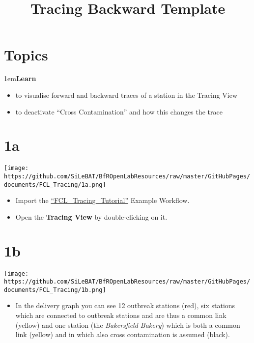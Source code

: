 \documentclass[10pt]{beamer}
\title{Tracing Backward Template}
\date{}
\begin{document}
\maketitle

\section{Topics}
\begin{frame}
\leftskip1em\textbf{Learn}
	\begin{itemize}
		\item to visualise forward and backward traces of a station in the Tracing View
		\item to deactivate “Cross Contamination” and how this changes the trace
	\end{itemize}
\end{frame}

\section{1a}
\begin{frame}
	\begin{center}
  		\texttt{[image: https://github.com/SiLeBAT/BfROpenLabResources/raw/master/GitHubPages/documents/FCL\_Tracing/1a.png]}
	\end{center}
	\begin{itemize}
		\item Import the  \href{https://github.com/SiLeBAT/BfROpenLabResources/raw/master/GitHubPages/workflows/FCL\_Tracing\_Tutorial.knwf}{``FCL\_Tracing\_Tutorial''} Example Workflow.
		\item Open the \textbf{Tracing View} by double-clicking on it.
	\end{itemize}
\end{frame}

\section{1b}
\begin{frame}
	\begin{center}
  		\texttt{[image: https://github.com/SiLeBAT/BfROpenLabResources/raw/master/GitHubPages/documents/FCL\_Tracing/1b.png]}
	\end{center}
	\begin{itemize}
		\item In the delivery graph you can see 12 outbreak stations (red), six stations which are connected to outbreak stations and are thus a common link (yellow) and one station (the \textit{Bakersfield Bakery}) which is both a common link (yellow) and in which also cross contamination is assumed (black).
	\end{itemize}
\end{frame}
\end{document}
